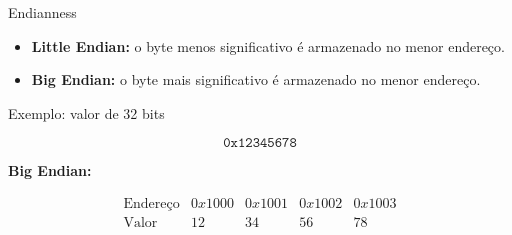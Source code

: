 

\begin{frame}{Endianness}
    \begin{itemize}
        \item \textbf{Little Endian:} o byte menos significativo
        é armazenado no menor endereço.

        \item \textbf{Big Endian:} o byte mais significativo
        é armazenado no menor endereço.
    \end{itemize}

    \vspace{0.5cm}

    Exemplo: valor de 32 bits

    \[
        \texttt{0x12345678}
    \]

    \vspace{0.3cm}

    \textbf{Big Endian:}

    \[
        \begin{array}{c|cccc}
        \text{Endereço} & 0x1000 & 0x1001 & 0x1002 & 0x1003 \\
        \hline
        \text{Valor} & 12 & 34 & 56 & 78
        \end{array}
    \]

\end{frame}